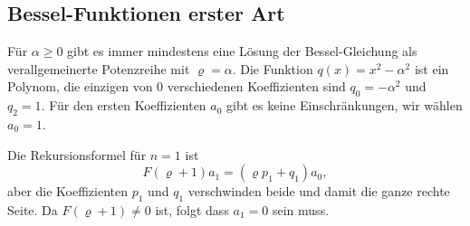 \subsection{Bessel-Funktionen erster Art
\label{buch:differentialgleichungen:subsection:bessel1steart}}
Für $\alpha \ge 0$ gibt es immer mindestens eine Lösung der Bessel-Gleichung
als verallgemeinerte Potenzreihe mit $\varrho=\alpha$.
Die Funktion $q(x)=x^2-\alpha^2$ ist ein Polynom, die einzigen
von $0$ verschiedenen Koeffizienten sind $q_0=-\alpha^2$
und $q_2=1$.
Für den ersten Koeffizienten $a_0$ gibt es keine Einschränkungen,
wir wählen $a_0=1$.

Die Rekursionsformel für $n=1$ ist
\[
F(\varrho+1) a_1 = (\varrho p_1+q_1)a_0,
\]
aber die Koeffizienten $p_1$ und $q_1$ verschwinden beide und damit
die ganze rechte Seite.
Da $F(\varrho+1)\ne 0$ ist, folgt dass $a_1=0$ sein muss.


%
%
